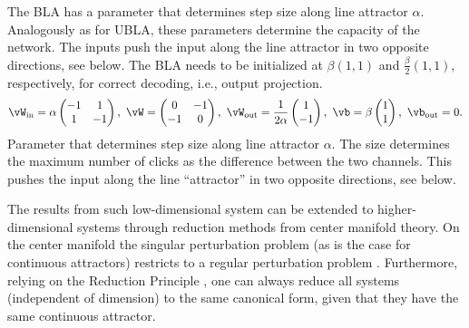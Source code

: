 \documentclass{article} %
\newcounter{ct}
\newcommand{\win}{\vW_{\text{in}}}
\newcommand{\wout}{\vW_{\text{out}}}
\newcommand{\bout}{\vb_{\text{out}}}
\theoremstyle{definition}
\theoremstyle{remark}
\begin{document}
The BLA has a parameter that determines step size along line attractor \(\alpha\). Analogously as for UBLA, these parameters determine the capacity of the network.
The inputs push the input along the line attractor in two opposite directions, see below. The BLA needs to be initialized at \(\beta(1, 1)\) and \(\tfrac{\beta}{2}(1, 1)\), respectively, for correct decoding, i.e., output projection.
\begin{equation}\label{eq:bla}
\win = \alpha
\begin{pmatrix}
-1  &  1 \\
1  &  -1
\end{pmatrix}, \
\vW =
\begin{pmatrix}
0  &  -1 \\
-1  &  0
\end{pmatrix}, \
\wout = \frac{1}{2\alpha}
\begin{pmatrix}
1  \\  -1
\end{pmatrix}, \
\vb = \beta
\begin{pmatrix}
1 \\  1
\end{pmatrix}, \
\bout = 0.
\end{equation}
Parameter that determines step size along line attractor \(\alpha\).
The size determines the maximum number of clicks as the difference between the two channels.
This pushes the input along the line ``attractor'' in two opposite directions, %
see below.


The results from such low-dimensional system can be extended to higher-dimensional systems through reduction methods from center manifold theory.
On the center manifold the singular perturbation problem (as is the case for continuous attractors) restricts to a regular perturbation problem \citep{fenichel1979geometric}. Furthermore, relying on the Reduction Principle \citep{kirchgraber1990geometry}, one can always reduce all systems (independent of dimension) to the same canonical form, given that they have the same continuous attractor.
\end{document}
